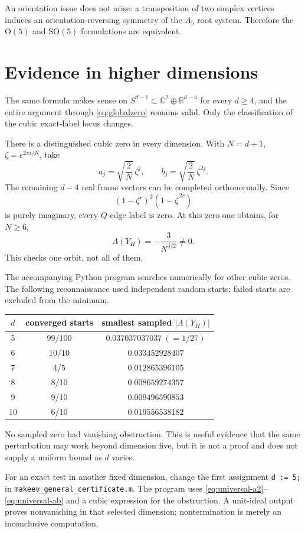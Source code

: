 \documentclass[11pt,reqno]{amsart}
\theoremstyle{remark}
\newcommand{\R}{\mathbb R}
\newcommand{\C}{\mathbb C}
\newcommand{\SO}{\mathrm{SO}}
\newcommand{\abs}[1]{\left\lvert #1\right\rvert}
\begin{document}
An orientation issue does not arise: a transposition of two simplex vertices
induces an orientation-reversing symmetry of the $A_5$ root system.  Therefore
the $\mathrm O(5)$ and $\SO(5)$ formulations are equivalent.

\section{Evidence in higher dimensions}

The same formula makes sense on
$S^{d-1}\subset\C^2\oplus\R^{d-4}$ for every $d\ge4$, and the entire argument
through \eqref{eq:globalzero} remains valid.  Only the classification of the
cubic exact-label locus changes.

There is a distinguished cubic zero in every dimension.  With
$N=d+1$, $\zeta=e^{2\pi i/N}$, take
\[
 a_j=\sqrt{\frac2N}\,\zeta^j,\qquad
 b_j=\sqrt{\frac2N}\,\zeta^{2j}.
\]
The remaining $d-4$ real frame vectors can be completed orthonormally.  Since
\[
 (1-\zeta^r)^2(1-\overline{\zeta}^{\,2r})
\]
is purely imaginary, every $Q$-edge label is zero.  At this zero one obtains,
for $N\ge6$,
\[
 \Lambda(Y_H)=-\frac{3}{N^{3/2}}\ne0.
\]
This checks one orbit, not all of them.

The accompanying Python program searches numerically for other cubic zeros.
The following reconnaissance used independent random starts; failed starts are
excluded from the minimum.
\begin{center}
\begin{tabular}{c@{\qquad}c@{\qquad}c}
\toprule
$d$&converged starts&smallest sampled $\abs{\Lambda(Y_H)}$\\
\midrule
5&99/100&$0.037037037037\ (=1/27)$\\
6&10/10&$0.033452928407$\\
7&4/5&$0.012865396105$\\
8&8/10&$0.008659274357$\\
9&9/10&$0.009496590853$\\
10&6/10&$0.019556538182$\\
\bottomrule
\end{tabular}
\end{center}
No sampled zero had vanishing obstruction.  This is useful evidence that the
same perturbation may work beyond dimension five, but it is not a proof and
does not supply a uniform bound as $d$ varies.

For an exact test in another fixed dimension, change the first assignment
\texttt{d := 5;} in \texttt{makeev\_general\_certificate.m}.  The program
uses \eqref{eq:universal-a2}--\eqref{eq:universal-ab} and a cubic expression
for the obstruction.  A unit-ideal output proves nonvanishing in that selected
dimension; nontermination is merely an inconclusive computation.
\end{document}
